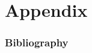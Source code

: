 \documentclass{article}
\begin{document}
\maketitle\thispagestyle{empty} %
\newpage\tableofcontents\thispagestyle{empty} %

\newpage\setcounter{page}{1} %
\pagestyle{fancy}



\label{mainDocumentEnd}

\newpage\pagestyle{empty}

\part{Appendix}

\section{Bibliography}


\end{document}
